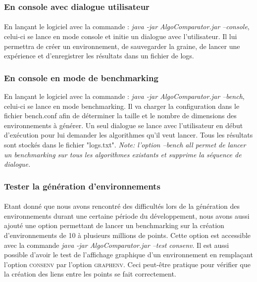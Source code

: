 \documentclass[pidr]{tnreport}
\begin{document}
			\subsubsection{En console avec dialogue utilisateur}

\paragraph{}
En lançant le logiciel avec la commande : \emph{java -jar AlgoComparator.jar --console}, celui-ci se lance en mode console et initie un dialogue avec l'utilisateur. Il lui permettra de créer un environnement, de sauvegarder la graine, de lancer une expérience et d'enregistrer les résultats dans un fichier de logs.

			\subsubsection{En console en mode de benchmarking}
			
En lançant le logiciel avec la commande : \emph{java -jar AlgoComparator.jar --bench}, celui-ci se lance en mode benchmarking. Il va charger la configuration dans le fichier bench.conf afin de déterminer la taille et le nombre de dimensions des environnements à générer. Un seul dialogue se lance avec l'utilisateur en début d'exécution pour lui demander les algorithmes qu'il veut lancer. Tous les résultats sont stockés dans le fichier "logs.txt". %
\newline
\emph{Note: l'option --bench all permet de lancer un benchmarking sur tous les algorithmes existants et supprime la séquence de dialogue.}
\cite{AIMA}
			
			\subsubsection{Tester la génération d'environnements}

\paragraph{}
Etant donné que nous avons rencontré des difficultés lors de la génération des environnements durant une certaine période du développement, nous avons aussi ajouté une option permettant de lancer un benchmarking sur la création d'environnements de 10 à plusieurs millions de points. Cette option est accessible avec la commande \emph{java -jar AlgoComparator.jar --test consenv}. \linebreak
Il est aussi possible d'avoir le test de l'affichage graphique d'un environnement en remplaçant l'option \textsc{consenv} par l'option \textsc{graphenv}. Ceci peut-être pratique pour vérifier que la création des liens entre les points se fait correctement.
\end{document}
